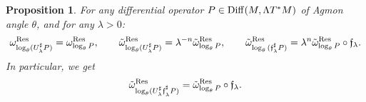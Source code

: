 \documentclass[pdftex]{sigma}
\numberwithin{equation}{section}
\newtheorem{prop}[thm]{Proposition}
\theoremstyle{definition}
\begin{document}
\begin{prop} \label{prop:pullbacklocalform} For any differential operator $P\in {\rm Diff}(M, \Lambda T^*M)$ of Agmon angle $\theta$, and for any $\lambda>0$:
\begin{gather}\label{eq:tildeu}
 \omega^{\rm Res}_{\log_\theta (U_\lambda^\sharp P)}=\omega^{\rm Res}_{\log_\theta P},\qquad \tilde \omega^{\rm Res}_{\log_\theta(U_\lambda^\sharp P)} =\lambda^{-n} \tilde \omega^{\rm Res}_{\log_\theta P},\qquad \tilde \omega^{ {\rm Res}}_{\log_\theta{({\mathfrak f}}_{ \lambda}^\sharp P)}=\lambda^{n} \tilde \omega^{\rm Res}_{\log_\theta P}\circ \mathfrak{f}_\lambda.
 \end{gather}
In particular, we get
	\begin{equation}\label{eq:tildeomegaflambda}
		\tilde \omega^{ {\rm Res}}_{\log_\theta({ U_\lambda^\sharp {\mathfrak f}}_{ \lambda}^\sharp P)}=\tilde \omega^{\rm Res}_{\log_\theta P}\circ {\mathfrak f}_{ \lambda}.\end{equation}
\end{prop}
\end{document}
